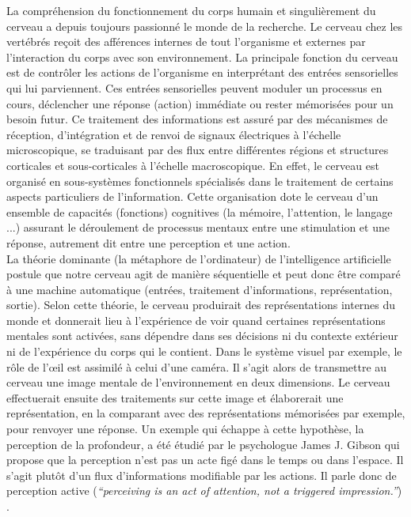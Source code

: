 \DontNumberThisInToc
\DontFrameThisInToc
{}

La compréhension du fonctionnement du corps humain et singulièrement du cerveau a depuis toujours passionné le monde de la recherche. Le cerveau chez les vertébrés reçoit des afférences internes de tout l'organisme et externes par l'interaction du corps avec son environnement. La principale fonction du cerveau est de contrôler les actions de l'organisme en interprétant des entrées sensorielles qui lui parviennent. Ces entrées sensorielles peuvent moduler un processus en cours, déclencher une réponse (action) immédiate ou rester mémorisées pour un besoin futur. Ce traitement des informations est assuré par des mécanismes de réception, d'intégration et de renvoi de signaux électriques à l'échelle microscopique, se traduisant par des flux entre différentes régions et structures corticales et sous-corticales à l'échelle macroscopique. En effet, le cerveau est organisé en sous-systèmes fonctionnels spécialisés dans le traitement de certains aspects particuliers de l'information. Cette organisation dote le cerveau d'un ensemble de capacités (fonctions) cognitives (la mémoire, l'attention, le langage ...) assurant le déroulement de  processus mentaux entre une stimulation et une réponse, autrement dit entre une perception et une action.\\

La théorie dominante (la métaphore de l'ordinateur) de l'intelligence artificielle postule que notre cerveau agit de manière séquentielle et peut donc être comparé à une machine automatique (entrées, traitement d'informations, représentation, sortie). Selon cette théorie, le cerveau produirait des représentations internes du monde et donnerait lieu à l'expérience de voir quand certaines représentations mentales sont activées, sans dépendre dans ses décisions ni du contexte extérieur ni de l'expérience du corps qui le contient. Dans le système visuel par exemple, le rôle de l'œil est assimilé à celui d'une caméra. Il s'agit alors de transmettre au cerveau  une image mentale de l'environnement en deux dimensions. Le cerveau effectuerait ensuite des traitements sur cette image et élaborerait une représentation, en la comparant avec des représentations mémorisées par exemple, pour renvoyer une réponse. Un exemple qui échappe à cette hypothèse, la perception de la profondeur, a été étudié par le psychologue  James J. Gibson qui propose que la perception n'est pas un acte figé dans le temps ou dans l'espace. Il s'agit plutôt d'un flux d'informations modifiable par les actions. Il parle donc de perception active (\textit{``perceiving is an act of attention, not a triggered impression.''}) \cite{Gibson:1986}.\\

